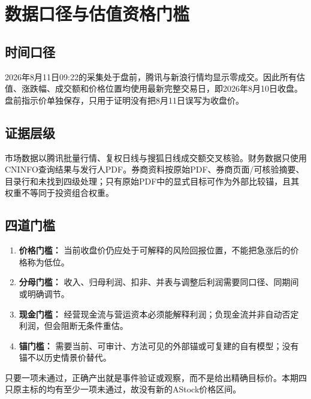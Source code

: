 \chapter{数据口径与估值资格门槛}

\section{时间口径}

2026年8月11日09:22的采集处于盘前，腾讯与新浪行情均显示零成交。因此所有估值、涨跌幅、成交额和价格位置均使用最新完整交易日，即2026年8月10日收盘。盘前指示价单独保存，只用于证明没有把8月11日误写为收盘价。

\section{证据层级}

市场数据以腾讯批量行情、复权日线与搜狐日线成交额交叉核验。财务数据只使用CNINFO查询结果与发行人PDF。券商资料按原始PDF、券商页面/可核验摘要、目录行和未找到四级处理；只有原始PDF中的显式目标可作为外部比较锚，且其权重不等同于投资组合权重。

\section{四道门槛}

\begin{exhibitbox}[图表2｜从历史空间到当前研究结论的四道门槛]
\begin{enumerate}
  \item \textbf{价格门槛：} 当前收盘价仍应处于可解释的风险回报位置，不能把急涨后的价格称为低位。
  \item \textbf{分母门槛：} 收入、归母利润、扣非、并表与调整后利润需要同口径、同期间或明确调节。
  \item \textbf{现金门槛：} 经营现金流与营运资本必须能解释利润；负现金流并非自动否定利润，但会阻断无条件重估。
  \item \textbf{锚门槛：} 需要当前、可审计、方法可见的外部锚或可复建的自有模型；没有锚不以历史情景价替代。
\end{enumerate}
\end{exhibitbox}

只要一项未通过，正确产出就是事件验证或观察，而不是给出精确目标价。本期四只原主标的均有至少一项未通过，故没有新的AStock价格区间。
